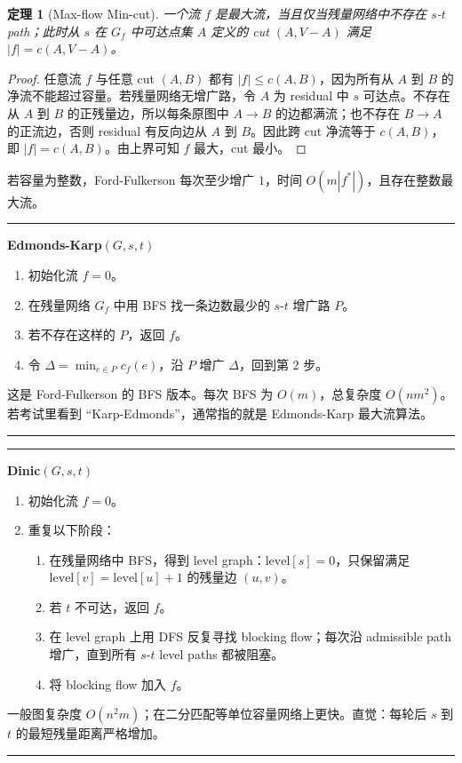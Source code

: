 \documentclass[UTF8,a4paper,11pt]{ctexart}
\newtheorem{theorem}{定理}[section]
\newenvironment{algobox}[1]
{\par\medskip\noindent\begin{minipage}{0.96\linewidth}\hrule\vspace{0.35em}\textbf{#1}\par\vspace{0.25em}\small}
{\par\vspace{0.25em}\hrule\end{minipage}\par\medskip}
\begin{document}
\begin{theorem}[Max-flow Min-cut]
一个流 $f$ 是最大流，当且仅当残量网络中不存在 $s$-$t$ path；此时从 $s$ 在 $G_f$ 中可达点集 $A$ 定义的 cut $(A,V-A)$ 满足 $|f|=c(A,V-A)$。
\end{theorem}
\begin{proof}
任意流 $f$ 与任意 cut $(A,B)$ 都有 $|f|\le c(A,B)$，因为所有从 $A$ 到 $B$ 的净流不能超过容量。若残量网络无增广路，令 $A$ 为 residual 中 $s$ 可达点。不存在从 $A$ 到 $B$ 的正残量边，所以每条原图中 $A\to B$ 的边都满流；也不存在 $B\to A$ 的正流边，否则 residual 有反向边从 $A$ 到 $B$。因此跨 cut 净流等于 $c(A,B)$，即 $|f|=c(A,B)$。由上界可知 $f$ 最大，cut 最小。
\end{proof}

若容量为整数，Ford-Fulkerson 每次至少增广 $1$，时间 $O(m|f^*|)$，且存在整数最大流。

\begin{algobox}{Edmonds-Karp$(G,s,t)$}
\begin{enumerate}
  \item 初始化流 $f=0$。
  \item 在残量网络 $G_f$ 中用 BFS 找一条边数最少的 $s$-$t$ 增广路 $P$。
  \item 若不存在这样的 $P$，返回 $f$。
  \item 令 $\Delta=\min_{e\in P}c_f(e)$，沿 $P$ 增广 $\Delta$，回到第 2 步。
\end{enumerate}
这是 Ford-Fulkerson 的 BFS 版本。每次 BFS 为 $O(m)$，总复杂度 $O(nm^2)$。若考试里看到 ``Karp-Edmonds''，通常指的就是 Edmonds-Karp 最大流算法。
\end{algobox}

\begin{algobox}{Dinic$(G,s,t)$}
\begin{enumerate}
  \item 初始化流 $f=0$。
  \item 重复以下阶段：
  \begin{enumerate}
    \item 在残量网络中 BFS，得到 level graph：$\mathrm{level}[s]=0$，只保留满足 $\mathrm{level}[v]=\mathrm{level}[u]+1$ 的残量边 $(u,v)$。
    \item 若 $t$ 不可达，返回 $f$。
    \item 在 level graph 上用 DFS 反复寻找 blocking flow；每次沿 admissible path 增广，直到所有 $s$-$t$ level paths 都被阻塞。
    \item 将 blocking flow 加入 $f$。
  \end{enumerate}
\end{enumerate}
一般图复杂度 $O(n^2m)$；在二分匹配等单位容量网络上更快。直觉：每轮后 $s$ 到 $t$ 的最短残量距离严格增加。
\end{algobox}
\end{document}
